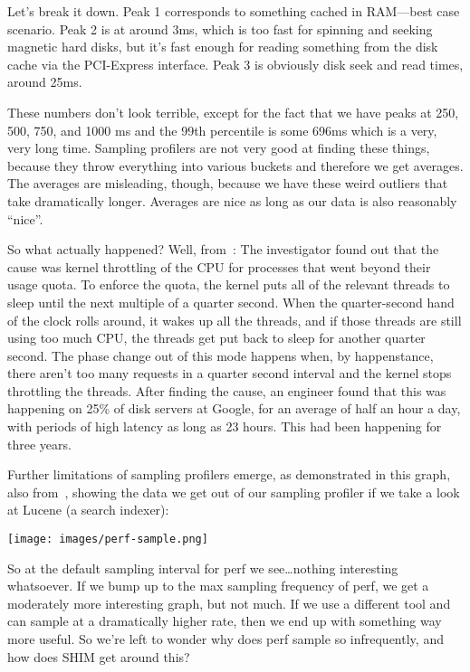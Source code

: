 Let's break it down. Peak 1 corresponds to something cached in RAM---best case scenario. Peak 2 is at around 3ms, which is too fast for spinning and seeking magnetic hard disks, but it's fast enough for reading something from the disk cache via the PCI-Express interface. Peak 3 is obviously disk seek and read times, around 25ms. 

These numbers don't look terrible, except for the fact that we have peaks at 250, 500, 750, and 1000 ms and the 99th percentile is some 696ms which is a very, very long time. Sampling profilers are not very good at finding these things, because they throw everything into various buckets and therefore we get averages. The averages are misleading, though, because we have these weird outliers that take dramatically longer. Averages are nice as long as our data is also reasonably ``nice''.

So what actually happened? Well, from~\cite{perf-tracing}: The investigator found out that the cause was kernel throttling of the CPU for processes that went beyond their usage quota. To enforce the quota, the kernel puts all of the relevant threads to sleep until the next multiple of a quarter second. When the quarter-second hand of the clock rolls around, it wakes up all the threads, and if those threads are still using too much CPU, the threads get put back to sleep for another quarter second. The phase change out of this mode happens when, by happenstance, there aren't too many requests in a quarter second interval and the kernel stops throttling the threads. After finding the cause, an engineer found that this was happening on 25\% of disk servers at Google, for an average of half an hour a day, with periods of high latency as long as 23 hours. This had been happening for three years.

Further limitations of sampling profilers emerge, as demonstrated in this graph, also from~\cite{perf-tracing}, showing the data we get out of our sampling profiler if we take a look at Lucene (a search indexer):

\begin{center}
	\texttt{[image: images/perf-sample.png]}
\end{center}

So at the default sampling interval for perf we see\ldots nothing interesting whatsoever. If we bump up to the max sampling frequency of perf, we get a moderately more interesting graph, but not much. If we use a different tool and can sample at a dramatically higher rate, then we end up with something way more useful. So we're left to wonder why does perf sample so infrequently, and how does SHIM get around this?

